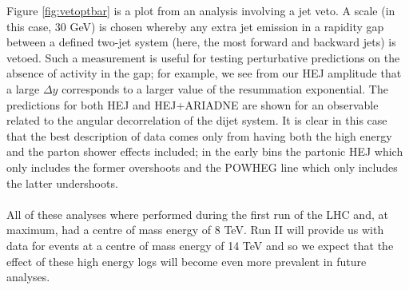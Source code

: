Figure \ref{fig:vetoptbar} is a plot from an analysis involving a jet veto. A scale (in this case, 30 GeV) is chosen whereby any extra jet emission in a rapidity gap between a defined two-jet system (here, the most forward and backward jets) is vetoed. Such a measurement is useful for testing perturbative predictions on the absence of activity in the gap; for example, we see from our HEJ amplitude that a large $\Delta y$ corresponds to a larger value of the resummation exponential. The predictions for both HEJ and HEJ+ARIADNE are shown for an observable related to the angular decorrelation of the dijet system. It is clear in this case that the best description of data comes only from having both the high energy and the parton shower effects included; in the early bins the partonic HEJ which only includes the former overshoots and the POWHEG line which only includes the latter undershoots. \\
\\
All of these analyses where performed during the first run of the LHC and, at maximum, had a centre of mass energy of 8 TeV. Run II will provide us with data for events at a centre of mass energy of 14 TeV and so we expect that the effect of these high energy logs will become even more prevalent in future analyses. 
